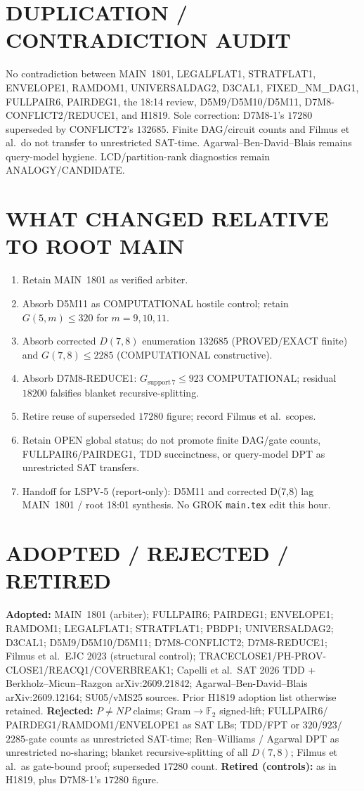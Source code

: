 \documentclass[11pt]{article}
\begin{document}
\section*{DUPLICATION / CONTRADICTION AUDIT}
No contradiction between MAIN~1801, LEGALFLAT1, STRATFLAT1, ENVELOPE1, RAMDOM1,
UNIVERSALDAG2, D3CAL1, FIXED\_NM\_DAG1, FULLPAIR6, PAIRDEG1, the 18:14 review,
D5M9/D5M10/D5M11, D7M8-CONFLICT2/REDUCE1, and H1819. Sole correction: D7M8-1's
$17280$ superseded by CONFLICT2's $132685$. Finite DAG/circuit counts and Filmus
et al.\ do not transfer to unrestricted SAT-time. Agarwal--Ben-David--Blais remains
query-model hygiene. LCD/partition-rank diagnostics remain ANALOGY/CANDIDATE.

\section*{WHAT CHANGED RELATIVE TO ROOT MAIN}
\begin{enumerate}
\item Retain MAIN~1801 as verified arbiter.
\item Absorb D5M11 as COMPUTATIONAL hostile control; retain $G(5,m)\le 320$ for
$m=9,10,11$.
\item Absorb corrected $D(7,8)$ enumeration $132685$ (PROVED/EXACT finite) and
$G(7,8)\le 2285$ (COMPUTATIONAL constructive).
\item Absorb D7M8-REDUCE1: $G_{\mathrm{support}\,7}\le 923$ COMPUTATIONAL; residual
$18200$ falsifies blanket recursive-splitting.
\item Retire reuse of superseded $17280$ figure; record Filmus et al.\ scopes.
\item Retain OPEN global status; do not promote finite DAG/gate counts,
FULLPAIR6/PAIRDEG1, TDD succinctness, or query-model DPT as unrestricted SAT
transfers.
\item Handoff for LSPV-5 (report-only): D5M11 and corrected D(7,8) lag MAIN~1801 /
root 18:01 synthesis. No GROK \texttt{main.tex} edit this hour.
\end{enumerate}

\section*{ADOPTED / REJECTED / RETIRED}
\textbf{Adopted:} MAIN~1801 (arbiter); FULLPAIR6; PAIRDEG1; ENVELOPE1; RAMDOM1;
LEGALFLAT1; STRATFLAT1; PBDP1; UNIVERSALDAG2; D3CAL1; D5M9/D5M10/D5M11;
D7M8-CONFLICT2; D7M8-REDUCE1; Filmus et al.\ EJC 2023 (structural control);
TRACECLOSE1/PH-PROV-CLOSE1/REACQ1/COVERBREAK1; Capelli et al.\ SAT 2026 TDD +
Berkholz--Micun--Razgon arXiv:2609.21842; Agarwal--Ben-David--Blais
arXiv:2609.12164; SU05/vMS25 sources. Prior H1819 adoption list otherwise retained.
\textbf{Rejected:} $P\neq NP$ claims; Gram$\to\mathbb F_2$ signed-lift; FULLPAIR6/
PAIRDEG1/RAMDOM1/ENVELOPE1 as SAT LBs; TDD/FPT or $320$/$923$/$2285$-gate counts as
unrestricted SAT-time; Ren--Williams / Agarwal DPT as unrestricted no-sharing;
blanket recursive-splitting of all $D(7,8)$; Filmus et al.\ as gate-bound proof;
superseded $17280$ count.
\textbf{Retired (controls):} as in H1819, plus D7M8-1's $17280$ figure.
\end{document}
